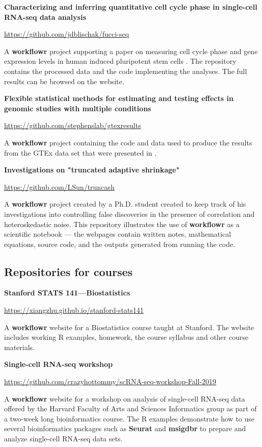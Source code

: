 \documentclass[9pt,a4paper]{extarticle}
\begin{document}
\textbf{Characterizing and inferring quantitative cell cycle phase in
single-cell RNA-seq data analysis}

\url{https://github.com/jdblischak/fucci-seq}

A \textbf{workflowr} project supporting a paper on measuring cell cycle phase and
gene expression levels in human induced pluripotent stem cells
\cite{Hsiao2019}. The repository contains the processed data and the
code implementing the analyses. The full results can be browsed on the
website.

\textbf{Flexible statistical methods for estimating and testing effects
in genomic studies with multiple conditions}

\url{https://github.com/stephenslab/gtexresults}

A \textbf{workflowr} project containing the code and data used to produce the
results from the GTEx data set that were presented in \cite{Urbut2019}.

\textbf{Investigations on "truncated adaptive shrinkage"}

\url{https://github.com/LSun/truncash}

A \textbf{workflowr} project created by a Ph.D. student created to keep track of
his investigations into controlling false discoveries in the presence of
correlation and heteroskedastic noise. This repository illustrates the
use of \textbf{workflowr} as a scientific notebook --- the webpages contain
written notes, mathematical equations, source code, and the outputs
generated from running the code.

\subsection*{Repositories for courses}

\textbf{Stanford STATS 141—Biostatistics}

\url{https://xiangzhu.github.io/stanford-stats141}

A \textbf{workflowr} website for a Biostatistics course taught at Stanford. The
website includes working R examples, homework, the course syllabus and
other course materials.

\textbf{Single-cell RNA-seq workshop}

\url{https://github.com/crazyhottommy/scRNA-seq-workshop-Fall-2019}

A \textbf{workflowr} website for a workshop on analysis of single-cell RNA-seq
data offered by the Harvard Faculty of Arts and Sciences Informatics
group as part of a two-week long bioinformatics course. The R examples
demonstrate how to use several bioinformatics packages such as \textbf{Seurat}
and \textbf{msigdbr} to prepare and analyze single-cell RNA-seq data sets.
\end{document}
